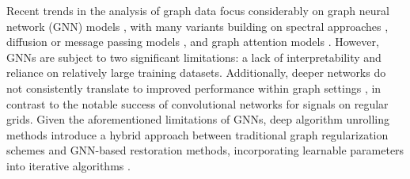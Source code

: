 Recent trends in the analysis of graph data focus considerably on graph neural network (GNN) models \cite{defferrard2016convolutional, kipf2017semi, HamiltonYL17}, with many variants building on spectral approaches \cite{levie2019cayleynets}, diffusion or message passing models \cite{atwood2016diffusion, Brockschmidt20, ZouCZLZWL24}, and graph attention models \cite{VelickovicCCRLB18, Brody0Y22}.  However, GNNs are subject to two significant limitations: a lack of interpretability and reliance on relatively large training datasets. Additionally, deeper networks do not consistently translate to improved performance within graph settings \cite{ZhaoA20}, in contrast to the notable success of convolutional networks for signals on regular grids. Given the aforementioned limitations of GNNs, deep algorithm unrolling methods introduce a hybrid approach between traditional graph regularization schemes and GNN-based restoration methods, incorporating learnable parameters into iterative algorithms \cite{chen2021graph, nagahama2022graph}. 







